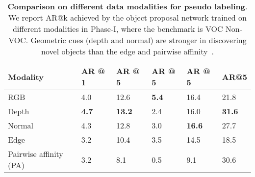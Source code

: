 \documentclass{article} \usepackage{iclr2023_conference,times}
\begin{document}
\begin{table*}[!t]
					\begin{tabular}{l|l|l|l|l|l}
						\toprule
						Modality & AR @ 1 &   AR @ 5      & AR @ 5 &  AR @ 5 & AR@5    \\ \midrule
                             RGB & 4.0&		12.6& \textbf{5.4} & 16.4 & 21.8	 \\
 Depth & \textbf{4.7}&		\textbf{13.2}&	2.4 & 16.0 & \textbf{31.6}	\\
Normal &4.3&		12.8&	3.0 & \textbf{16.6} & 27.7	\\
Edge & 3.2&		10.4& 3.5 & 14.5 & 18.5	 \\
                    Pairwise affinity (PA) & 3.2 & 8.1 & 0.5 & 9.1 & 30.6
                             \\
                    \bottomrule
						\end{tabular}
	\caption{\textbf{Comparison on different data modalities for pseudo labeling}. We report AR@k achieved by the object proposal network trained on different modalities in Phase-I, where the benchmark is VOC  Non-VOC. Geometric cues (depth and normal) are stronger in discovering novel objects than the edge and pairwise affinity~\citep{wang2022open}.}
	\label{table:comparison_pseudo_box}
\end{table*}
 
\end{document}
